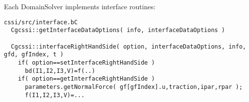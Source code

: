 \noindent Each DomainSolver implements interface routines: 
{
\small
\begin{verbatim}
cssi/src/interface.bC
  Cgcssi::getInterfaceDataOptions( info, interfaceDataOptions ) 

  Cgcssi::interfaceRightHandSide( option, interfaceDataOptions, info, gfd, gfIndex, t )
    if( option==setInterfaceRightHandSide )
      bd(I1,I2,I3,V)=f(..)
    if( option==getInterfaceRightHandSide )
      parameters.getNormalForce( gf[gfIndex].u,traction,ipar,rpar );
      f(I1,I2,I3,V)=...
\end{verbatim}
}


